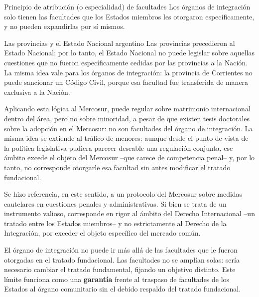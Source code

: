 \documentclass[12pt,oneside]{book}
\begin{document}
\begin{definicion}{Principio de atribución (o especialidad) de facultades}
Los órganos de integración solo tienen las facultades que los Estados miembros les otorgaron específicamente, y no pueden expandirlas por sí mismos.
\end{definicion}

\begin{ejemplo}{Las provincias y el Estado Nacional argentino}
Las provincias precedieron al Estado Nacional; por lo tanto, el Estado Nacional no puede legislar sobre aquellas cuestiones que no fueron específicamente cedidas por las provincias a la Nación. La misma idea vale para los órganos de integración: la provincia de Corrientes no puede sancionar un Código Civil, porque esa facultad fue transferida de manera exclusiva a la Nación.
\end{ejemplo}

Aplicando esta lógica al Mercosur, puede regular sobre matrimonio internacional dentro del área, pero no sobre minoridad, a pesar de que existen tesis doctorales sobre la adopción en el Mercosur: no son facultades del órgano de integración. La misma idea se extiende al tráfico de menores: aunque desde el punto de vista de la política legislativa pudiera parecer deseable una regulación conjunta, ese ámbito excede el objeto del Mercosur --que carece de competencia penal-- y, por lo tanto, no corresponde otorgarle esa facultad sin antes modificar el tratado fundacional.

\begin{nota}
Se hizo referencia, en este sentido, a un protocolo del Mercosur sobre medidas cautelares en cuestiones penales y administrativas. Si bien se trata de un instrumento valioso, corresponde en rigor al ámbito del Derecho Internacional --un tratado entre los Estados miembros-- y no estrictamente al Derecho de la Integración, por exceder el objeto específico del mercado común.
\end{nota}

\begin{importante}
El órgano de integración no puede ir más allá de las facultades que le fueron otorgadas en el tratado fundacional. Las facultades no se amplían solas: sería necesario cambiar el tratado fundamental, fijando un objetivo distinto. Este límite funciona como una \textbf{garantía} frente al traspaso de facultades de los Estados al órgano comunitario sin el debido respaldo del tratado fundacional.
\end{importante}
\end{document}
